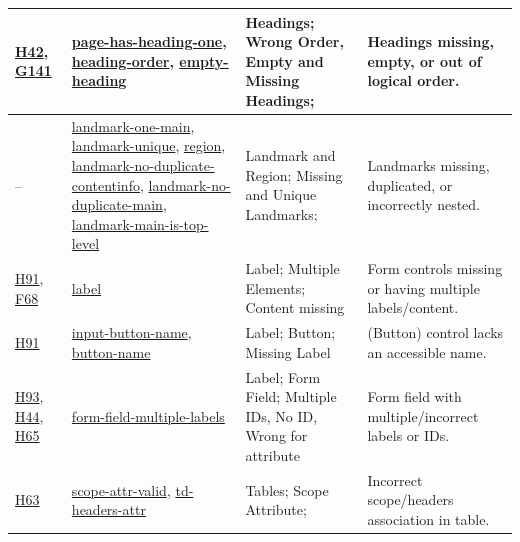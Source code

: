 \begin{table}[htbp]
\begin{tabularx}{\textwidth}{|L{2cm}|L{4.5cm}|L{3.5cm}|Y|}
\href{https://www.w3.org/TR/WCAG20-TECHS/H42.html}{H42},
\href{https://www.w3.org/TR/WCAG20-TECHS/G141.html}{G141} &
\href{https://dequeuniversity.com/rules/axe/4.10/page-has-heading-one}{page-has-heading-one},
\href{https://dequeuniversity.com/rules/axe/4.10/heading-order}{heading-order},
\href{https://dequeuniversity.com/rules/axe/4.10/empty-heading}{empty-heading} &
Headings; Wrong Order, Empty and Missing Headings; &
Headings missing, empty, or out of logical order.\\ \hline

-- &
\href{https://dequeuniversity.com/rules/axe/4.10/landmark-one-main}{landmark-one-main},
\href{https://dequeuniversity.com/rules/axe/4.10/landmark-unique}{landmark-unique},
\href{https://dequeuniversity.com/rules/axe/4.10/region}{region},
\href{https://dequeuniversity.com/rules/axe/4.10/landmark-no-duplicate-contentinfo}{landmark-no-duplicate-contentinfo},
\href{https://dequeuniversity.com/rules/axe/4.10/landmark-no-duplicate-main}{landmark-no-duplicate-main},
\href{https://dequeuniversity.com/rules/axe/4.10/landmark-main-is-top-level}{landmark-main-is-top-level} &
Landmark and Region; Missing and Unique Landmarks; &
Landmarks missing, duplicated, or incorrectly nested.\\ \hline


\href{https://www.w3.org/TR/WCAG20-TECHS/H91.html}{H91},
\href{https://www.w3.org/TR/WCAG20-TECHS/F68.html}{F68} &
\href{https://dequeuniversity.com/rules/axe/4.10/label}{label} &
Label; Multiple Elements; Content missing &
Form controls missing or having multiple labels/content.\\ \hline


\href{https://www.w3.org/TR/WCAG20-TECHS/H91.html}{H91}&
\href{https://dequeuniversity.com/rules/axe/4.10/input-button-name}{input-button-name},
\href{https://dequeuniversity.com/rules/axe/4.10/button-name}{button-name} &
Label; Button; Missing Label &
(Button) control lacks an accessible name.\\ \hline

\href{https://www.w3.org/TR/WCAG20-TECHS/H93.html}{H93},
\href{https://www.w3.org/TR/WCAG20-TECHS/H44.html}{H44},
\href{https://www.w3.org/TR/WCAG20-TECHS/H65.html}{H65} &
\href{https://dequeuniversity.com/rules/axe/4.10/form-field-multiple-labels}{form-field-multiple-labels} &
Label; Form Field; Multiple IDs, No ID, Wrong for attribute &
Form field with multiple/incorrect labels or IDs.\\ \hline


\href{https://www.w3.org/TR/WCAG20-TECHS/H63.html}{H63}&
\href{https://dequeuniversity.com/rules/axe/4.10/scope-attr-valid}{scope-attr-valid},
\href{https://dequeuniversity.com/rules/axe/4.10/td-headers-attr}{td-headers-attr} &
Tables; Scope Attribute; &
Incorrect scope/headers association in table.\\ \hline



\end{tabularx}
\end{table}
